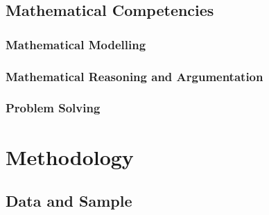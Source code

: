 \documentclass[
    a4paper,                %
    11pt,                   %
    stu,                    %
    donotrepeattitle,       %
    floatsintext,           %
    biblatex,               %
    colorlinks=true,        %
    linkcolor=red,          %
    anchorcolor=black,      %
    citecolor=blue,         %
    urlcolor=blue,          %
    bookmarks=true,         %
    bookmarksopen=false,    %
    bookmarksnumbered=true, %
    dvipsnames              %
]{apa7}
\begin{document}
\subsection{Mathematical Competencies}

\subsubsection{Mathematical Modelling}

\subsubsection{Mathematical Reasoning and Argumentation}

\subsubsection{Problem Solving}

\section{Methodology}

\subsection{Data and Sample}
\end{document}
